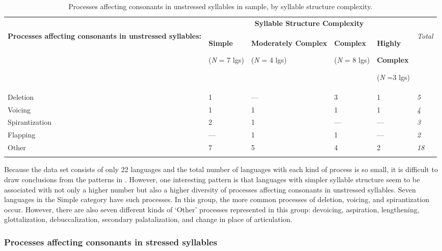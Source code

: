 \begin{table}
\begin{tabularx}{\textwidth}{XXXXXX}
\lsptoprule
 & \multicolumn{4}{c}{ \textbf{Syllable Structure Complexity}} & \\
 \textbf{Processes affecting consonants in unstressed syllables:} & { \textbf{Simple}}

 (\textit{N} = 7 lgs) & { \textbf{Moderately Complex}}

 (\textit{N} = 4 lgs) & { \textbf{Complex}}

 (\textit{N} = 8 lgs) & { \textbf{Highly} }

{ \textbf{Complex}}

 (\textit{N} =3 lgs) & \textit{Total}\\
 Deletion & 1 & — & 3 & 1 & \textit{5}\\
 Voicing & 1 & 1 & 1 & 1 & \textit{4}\\
 Spirantization & 2 & 1 & — & — & \textit{3}\\
 Flapping & — & 1 & 1 & — & \textit{2}\\
 Other & 7 & 5 & 4 & 2 & \textit{18}\\
\lspbottomrule
\end{tabularx}
\caption{\label{tab:5.6}Processes affecting consonants in unstressed syllables in sample, by syllable structure complexity.}
\end{table}

  Because the data set consists of only 22 languages and the total number of languages with each kind of process is so small, it is difficult to draw conclusions from the patterns in . However, one interesting pattern is that languages with simpler syllable structure seem to be associated with not only a higher number but also a higher diversity of processes affecting consonants in unstressed syllables. Seven languages in the Simple category have such processes. In this group, the more common processes of deletion, voicing, and spirantization occur. However, there are also seven different kinds of ‘Other’ processes represented in this group: devoicing, aspiration, lengthening, glottalization, debuccalization, secondary palatalization, and change in place of articulation.

\subsubsection{{Processes} {affecting} {consonants} {in} {stressed} {syllables}}\label{sec:5.4.3.3}

